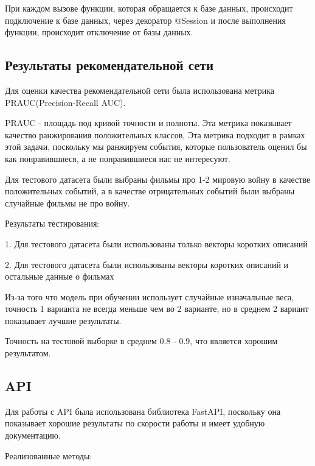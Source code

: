 При каждом вызове функции, которая обращается к базе данных, происходит подключение к базе данных, через декоратор
@Session и после выполнения функции, происходит отключение от базы данных.

\subsection{Результаты рекомендательной сети}

Для оценки качества рекомендательной сети была использована метрика PRAUC(Precision-Recall AUC).

PRAUC - площадь под кривой точности и полноты.
Эта метрика показывает качество ранжирования положительных классов, Эта метрика подходит в рамках этой задачи,
поскольку мы ранжируем события, которые пользователь оценил бы как понравившиеся, а не понравившиеся нас не интересуют.

Для тестового датасета были выбраны фильмы про 1-2 мировую войну в качестве положительных событий, а в качестве
отрицательных событий были выбраны случайные фильмы не про войну.

Результаты тестирования:

1. Для тестового датасета были использованы только векторы коротких описаний


\clearpage

2. Для тестового датасета были использованы векторы коротких описаний и остальные данные о фильмах


Из-за того что модель при обучении использует случайные изначальные веса, точность 1 варианта не всегда меньше чем
во 2 варианте, но в среднем 2 вариант показывает лучшие результаты.

Точность на тестовой выборке в среднем 0.8 - 0.9, что является хорошим результатом.

\subsection{API}

Для работы с API была использована библиотека FastAPI, поскольку она показывает хорошие результаты по скорости работы
и имеет удобную документацию.




Реализованные методы:

